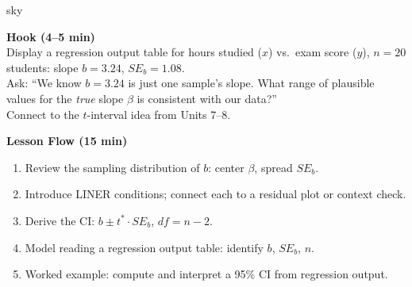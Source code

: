 \documentclass[10pt]{article}
\begin{document}
\begin{skillbox}{sky}
\begin{minipage}[t]{0.48\linewidth}
    \textbf{Hook (4--5 min)}\\
    Display a regression output table for hours studied ($x$) vs.\ exam score ($y$),
    $n = 20$ students: slope $b = 3.24$, $SE_b = 1.08$.\\[4pt]
    Ask: ``We know $b = 3.24$ is just one sample's slope.  What range of plausible values
    for the \emph{true} slope $\beta$ is consistent with our data?''\\[4pt]
    Connect to the $t$-interval idea from Units 7--8.
\end{minipage}
\hfill
\begin{minipage}[t]{0.48\linewidth}
    \textbf{Lesson Flow (15 min)}
    \begin{enumerate}
        \item Review the sampling distribution of $b$: center $\beta$, spread $SE_b$.
        \item Introduce LINER conditions; connect each to a residual plot or context check.
        \item Derive the CI: $b \pm t^* \cdot SE_b$, $df = n-2$.
        \item Model reading a regression output table: identify $b$, $SE_b$, $n$.
        \item Worked example: compute and interpret a 95\% CI from regression output.
    \end{enumerate}
\end{minipage}
\end{skillbox}
\end{document}
